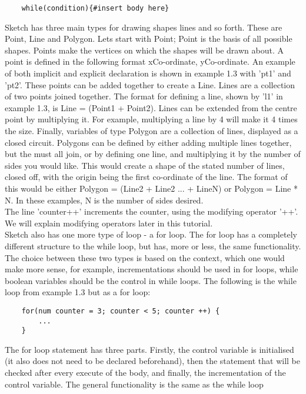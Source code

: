 \documentclass{l3proj}
\begin{document}
\begin{verbatim}
    while(condition){#insert body here} 
\end{verbatim}
Sketch has three main types for drawing shapes lines and so forth. These are Point, Line and Polygon. Lets start with Point; Point is the basis of all possible shapes. Points make the vertices on which the shapes will be drawn about. A point is defined in the following format {xCo-ordinate, yCo-ordinate}. An example of both implicit and explicit declaration is shown in example 1.3 with 'pt1' and 'pt2'. These points can be added together to create a Line. Lines are a collection of two points joined together. The format for defining a line, shown by 'l1' in example 1.3, is Line = (Point1 + Point2). Lines can be extended from the centre point by multiplying it. For example, multiplying a line by 4 will make it 4 times the size. Finally, variables of type Polygon are a collection of lines, displayed as a closed circuit. Polygons can be defined by either adding multiple lines together, but the must all join, or by defining one line, and multiplying it by the number of sides you would like. This would create a shape of the stated number of lines, closed off, with the origin being the first co-ordinate of the line. The format of this would be either Polygon = (Line2 + Line2 ... + LineN) or Polygon = Line * N. In these examples, N is the number of sides desired.
\\ [12pt]
The line 'counter++' increments the counter, using the modifying operator '++'. We will explain modifying operators later in this tutorial.
\\ [12pt]
Sketch also has one more type of loop - a for loop. The for loop has a completely different structure to the while loop, but has, more or less, the same functionality. The choice between these two types is based on the context, which one would make more sense, for example, incrementations should be used in for loops, while boolean variables should be the control in while loops. The following is the while loop from example 1.3 but as a for loop:
\begin{verbatim}
    for(num counter = 3; counter < 5; counter ++) {
        ...
    }
\end{verbatim}
The for loop statement has three parts. Firstly, the control variable is initialised (it also does not need to be declared beforehand), then the statement that will be checked after every execute of the body, and finally, the incrementation of the control variable. The general functionality is the same as the while loop
\end{document}
